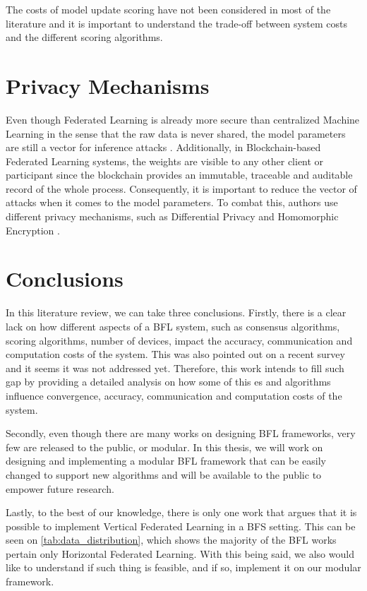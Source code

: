 The costs of model update scoring have not been considered in most of the literature and it is important to understand the trade-off between system costs and the different scoring algorithms\cite{9403374, 10.48550/arxiv.2110.02182}.

\section{Privacy Mechanisms}\label{related_work:privacy}

Even though Federated Learning is already more secure than centralized Machine Learning in the sense that the raw data is never shared, the model parameters are still a vector for inference attacks \cite{10.1145/3298981}. Additionally, in Blockchain-based Federated Learning systems, the weights are visible to any other client or participant since the blockchain provides an immutable, traceable and auditable record of the whole process. Consequently, it is important to reduce the vector of attacks when it comes to the model parameters. To combat this, authors use different privacy mechanisms, such as Differential Privacy \cite{10.48550/arxiv.2007.03856, Peyvandi2022, 9170559} and Homomorphic Encryption \cite{8945913, 8894364}.

\section{Conclusions}\label{related_work:conclusions}

In this literature review, we can take three conclusions. Firstly, there is a clear lack on how different aspects of a BFL system, such as consensus algorithms, scoring algorithms, number of devices, impact the accuracy, communication and computation costs of the system. This was also pointed out on a recent survey \cite{9403374} and it seems it was not addressed yet. Therefore, this work intends to fill such gap by providing a detailed analysis on how some of this es and algorithms influence convergence, accuracy, communication and computation costs of the system.

Secondly, even though there are many works on designing BFL frameworks, very few are released to the public, or modular. In this thesis, we will work on designing and implementing a modular BFL framework that can be easily changed to support new algorithms and will be available to the public to empower future research.

Lastly, to the best of our knowledge, there is only one work that argues that it is possible to implement Vertical Federated Learning in a BFS setting. This can be seen on \autoref{tab:data_distribution}, which shows the majority of the BFL works pertain only Horizontal Federated Learning. With this being said, we also would like to understand if such thing is feasible, and if so, implement it on our modular framework.





